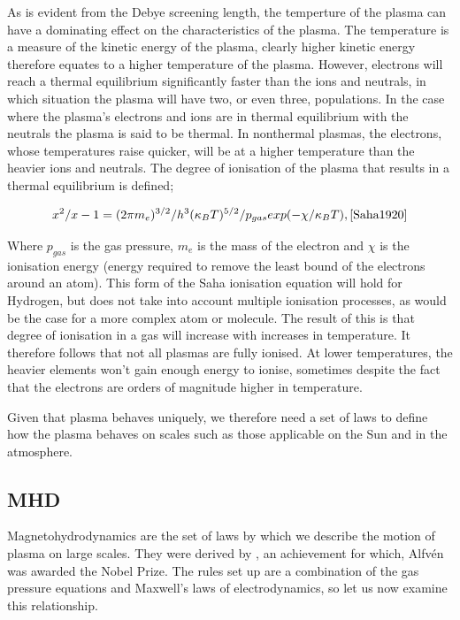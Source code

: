 As is evident from the Debye screening length, the temperture of the plasma can have a dominating effect on the characteristics of the plasma.
The temperature is a measure of the kinetic energy of the plasma, clearly higher kinetic energy therefore equates to a higher temperature of the plasma.
However, electrons will reach a thermal equilibrium significantly faster than the ions and neutrals, in which situation the plasma will have two, or even three, populations.
In the case where the plasma's electrons and ions are in thermal equilibrium with the neutrals the plasma is said to be thermal.
In nonthermal plasmas, the electrons, whose temperatures raise quicker, will be at a higher temperature than the heavier ions and neutrals.
The degree of ionisation of the plasma that results in a thermal equilibrium is defined;

\begin{equation}
	x^2/{x - 1} = (2\pi m_e)^{3/2}/h^3 (\kappa_BT)^{5/2}/p_{gas} exp(-{\chi/\kappa_BT}), \cite{Saha1920}
\end{equation}

Where $p_{gas}$ is the gas pressure, $m_e$ is the mass of the electron and $\chi$ is the ionisation energy (energy required to remove the least bound of the electrons around an atom).
This form of the Saha ionisation equation will hold for Hydrogen, but does not take into account multiple ionisation processes, as would be the case for a more complex atom or molecule.
The result of this is that degree of ionisation in a gas will increase with increases in temperature.
It therefore follows that not all plasmas are fully ionised.
At lower temperatures, the heavier elements won't gain enough energy to ionise, sometimes despite the fact that the electrons are orders of magnitude higher in temperature.

Given that plasma behaves uniquely, we therefore need a set of laws to define how the plasma behaves on scales such as those applicable on the Sun and in the atmosphere. %


\subsection{MHD}

Magnetohydrodynamics are the set of laws by which we describe the motion of plasma on large scales.
They were derived by \cite{Alfven1942}, an achievement for which, Alfv{\'e}n was awarded the Nobel Prize.
The rules set up are a combination of the gas pressure equations and Maxwell's laws of electrodynamics, so let us now examine this relationship.

